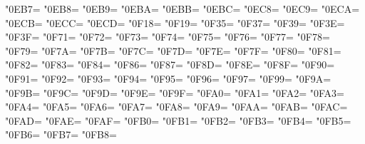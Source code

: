\XeTeXcharclass"0EB7=\KclassCM
\XeTeXcharclass"0EB8=\KclassCM
\XeTeXcharclass"0EB9=\KclassCM
\XeTeXcharclass"0EBA=\KclassCM
\XeTeXcharclass"0EBB=\KclassCM
\XeTeXcharclass"0EBC=\KclassCM
\XeTeXcharclass"0EC8=\KclassCM
\XeTeXcharclass"0EC9=\KclassCM
\XeTeXcharclass"0ECA=\KclassCM
\XeTeXcharclass"0ECB=\KclassCM
\XeTeXcharclass"0ECC=\KclassCM
\XeTeXcharclass"0ECD=\KclassCM
\XeTeXcharclass"0F18=\KclassCM
\XeTeXcharclass"0F19=\KclassCM
\XeTeXcharclass"0F35=\KclassCM
\XeTeXcharclass"0F37=\KclassCM
\XeTeXcharclass"0F39=\KclassCM
\XeTeXcharclass"0F3E=\KclassCM
\XeTeXcharclass"0F3F=\KclassCM
\XeTeXcharclass"0F71=\KclassCM
\XeTeXcharclass"0F72=\KclassCM
\XeTeXcharclass"0F73=\KclassCM
\XeTeXcharclass"0F74=\KclassCM
\XeTeXcharclass"0F75=\KclassCM
\XeTeXcharclass"0F76=\KclassCM
\XeTeXcharclass"0F77=\KclassCM
\XeTeXcharclass"0F78=\KclassCM
\XeTeXcharclass"0F79=\KclassCM
\XeTeXcharclass"0F7A=\KclassCM
\XeTeXcharclass"0F7B=\KclassCM
\XeTeXcharclass"0F7C=\KclassCM
\XeTeXcharclass"0F7D=\KclassCM
\XeTeXcharclass"0F7E=\KclassCM
\XeTeXcharclass"0F7F=\KclassCM
\XeTeXcharclass"0F80=\KclassCM
\XeTeXcharclass"0F81=\KclassCM
\XeTeXcharclass"0F82=\KclassCM
\XeTeXcharclass"0F83=\KclassCM
\XeTeXcharclass"0F84=\KclassCM
\XeTeXcharclass"0F86=\KclassCM
\XeTeXcharclass"0F87=\KclassCM
\XeTeXcharclass"0F8D=\KclassCM
\XeTeXcharclass"0F8E=\KclassCM
\XeTeXcharclass"0F8F=\KclassCM
\XeTeXcharclass"0F90=\KclassCM
\XeTeXcharclass"0F91=\KclassCM
\XeTeXcharclass"0F92=\KclassCM
\XeTeXcharclass"0F93=\KclassCM
\XeTeXcharclass"0F94=\KclassCM
\XeTeXcharclass"0F95=\KclassCM
\XeTeXcharclass"0F96=\KclassCM
\XeTeXcharclass"0F97=\KclassCM
\XeTeXcharclass"0F99=\KclassCM
\XeTeXcharclass"0F9A=\KclassCM
\XeTeXcharclass"0F9B=\KclassCM
\XeTeXcharclass"0F9C=\KclassCM
\XeTeXcharclass"0F9D=\KclassCM
\XeTeXcharclass"0F9E=\KclassCM
\XeTeXcharclass"0F9F=\KclassCM
\XeTeXcharclass"0FA0=\KclassCM
\XeTeXcharclass"0FA1=\KclassCM
\XeTeXcharclass"0FA2=\KclassCM
\XeTeXcharclass"0FA3=\KclassCM
\XeTeXcharclass"0FA4=\KclassCM
\XeTeXcharclass"0FA5=\KclassCM
\XeTeXcharclass"0FA6=\KclassCM
\XeTeXcharclass"0FA7=\KclassCM
\XeTeXcharclass"0FA8=\KclassCM
\XeTeXcharclass"0FA9=\KclassCM
\XeTeXcharclass"0FAA=\KclassCM
\XeTeXcharclass"0FAB=\KclassCM
\XeTeXcharclass"0FAC=\KclassCM
\XeTeXcharclass"0FAD=\KclassCM
\XeTeXcharclass"0FAE=\KclassCM
\XeTeXcharclass"0FAF=\KclassCM
\XeTeXcharclass"0FB0=\KclassCM
\XeTeXcharclass"0FB1=\KclassCM
\XeTeXcharclass"0FB2=\KclassCM
\XeTeXcharclass"0FB3=\KclassCM
\XeTeXcharclass"0FB4=\KclassCM
\XeTeXcharclass"0FB5=\KclassCM
\XeTeXcharclass"0FB6=\KclassCM
\XeTeXcharclass"0FB7=\KclassCM
\XeTeXcharclass"0FB8=\KclassCM
